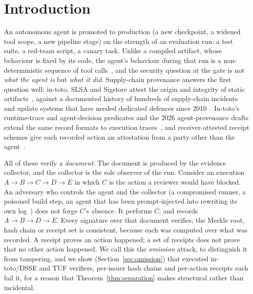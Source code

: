 \documentclass[letterpaper,10pt,twocolumn]{article}
\theoremstyle{definition}
\begin{document}
\section{Introduction}
An autonomous agent is promoted to production (a new checkpoint, a widened tool scope, a new pipeline stage) on the strength of an evaluation run: a test suite, a red-team script, a canary task. Unlike a compiled artifact, whose behaviour is fixed by its code, the agent's behaviour during that run is a non-deterministic sequence of tool calls~\cite{jimenez2024swebench, yao2023react, greshake2023not}, and the security question at the gate is not \emph{what the agent is} but \emph{what it did}. Supply-chain provenance answers the first question well: in-toto, SLSA and Sigstore attest the origin and integrity of static artifacts~\cite{torres2019in-toto, slsa2023supply, sigstore2022cosign}, against a documented history of hundreds of supply-chain incidents~\cite{ladisa2023sok, okafor2022sok, duan2021towards} and update systems that have needed dedicated defences since 2010~\cite{samuel2010surviving, cappos2008look, moore2023artemis}. In-toto's runtime-trace and agent-decision predicates and the 2026 agent-provenance drafts extend the same record formats to execution traces~\cite{intoto_runtime_trace, intoto2026agent-decision, apas2026agent-provenance, aas12026agent-audit}, and receiver-attested receipt schemes give each recorded action an attestation from a party other than the agent~\cite{notarized2026agents, pipelab2026receipts}.

All of these verify a \emph{document}. The document is produced by the evidence collector, and the collector is the sole observer of the run. Consider an execution $A \rightarrow B \rightarrow C \rightarrow D \rightarrow E$ in which $C$ is the action a reviewer would have blocked. An adversary who controls the agent and the collector  (a compromised runner, a poisoned build step, an agent that has been prompt-injected into rewriting its own log~\cite{greshake2023not})  does not forge $C$'s absence. It performs $C$, and records $A \rightarrow B \rightarrow D \rightarrow E$. Every signature over that document verifies; the Merkle root, hash chain or receipt set is consistent, because each was computed over what was recorded. A receipt proves an action happened; a set of receipts does not prove that no other action happened. We call this the \emph{omission} attack, to distinguish it from tampering, and we show (Section~\ref{sec:omission}) that executed in-toto/DSSE and TUF verifiers, per-issuer hash chains and per-action receipts each fail it, for a reason that Theorem~\ref{thm:separation} makes structural rather than incidental.
\end{document}
